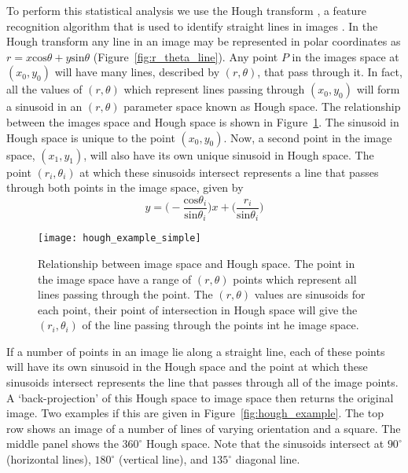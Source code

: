 To perform this statistical analysis we use the Hough transform \citep{hough1961}, a feature recognition algorithm that is used to identify straight lines in images \citep{duda1972}. In the Hough transform any line in an image may be represented in polar coordinates as $r=x\mathrm{cos}\theta +y\mathrm{sin}\theta$ (Figure~\ref{fig:r_theta_line}). Any point $P$ in the images space at $(x_0, y_0)$ will have many lines, described by $(r,\theta)$, that pass through it. In fact, all the values of $(r, \theta)$ which represent lines passing through $(x_0, y_0)$ will form a sinusoid in an $(r,\theta)$ parameter space known as Hough space. The relationship between the images space and Hough space is shown in Figure~\ref{fig:image_hough}. The sinusoid in Hough space is unique to the point $(x_0, y_0)$. Now, a second point in the image space, $(x_1, y_1)$, will also have its own unique sinusoid in Hough space. The point $(r_i,\theta_i)$ at which these sinusoids intersect represents a line that passes through both points in the image space, given by
\begin{equation}
y = \bigg(- \frac{\mathrm{cos}\theta_i}{\mathrm{sin}\theta_i}\bigg)x + \bigg(\frac{r_i}{\mathrm{sin}\theta_i}\bigg)
\end{equation}
\begin{figure}[t!]
\begin{center}
\texttt{[image: hough\_example\_simple]}
\caption[Relationship between image space and Hough space]{Relationship between image space and Hough space. The point in the image space have a range of $(r, \theta)$ points which represent all lines passing through the point. The $(r,\theta)$ values are sinusoids for each point, their point of intersection in Hough space will give the $(r_i, \theta_i)$ of the line passing through the points int he image space.}
\label{fig:image_hough}
\end{center}
\end{figure}
If a number of points in an image lie along a straight line, each of these points will have its own sinusoid in the Hough space and the point at which these sinusoids intersect represents the line that passes through all of the image points. A `back-projection' of this Hough space to image space then returns the original image. Two examples if this are given in Figure~\ref{fig:hough_example}. The top row shows an image of a number of lines of varying orientation and a square. The middle panel shows the $360^{\circ}$ Hough space. Note that the sinusoids intersect at $90^{\circ}$ (horizontal lines), $180^{\circ}$ (vertical line), and $135^{\circ}$ diagonal line. 
